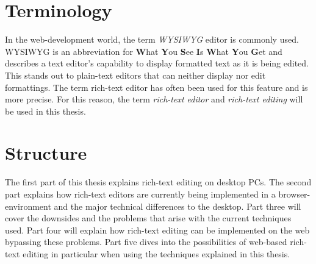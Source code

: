 \section{Terminology}

In the web-development world, the term \textit{WYSIWYG} editor is commonly used. WYSIWYG is an abbreviation for \textbf{W}hat \textbf{Y}ou \textbf{S}ee \textbf{I}s \textbf{W}hat \textbf{Y}ou \textbf{G}et and describes a text editor's capability to display formatted text as it is being edited. This stands out to plain-text editors that can neither display nor edit formattings. The term rich-text editor has often been used for this feature and is more precise. For this reason, the term \textit{rich-text editor} and \textit{rich-text editing} will be used in this thesis.


\section{Structure}

The first part of this thesis explains rich-text editing on desktop PCs. The second part explains how rich-text editors are currently being implemented in a browser-environment and the major technical differences to the desktop. Part three will cover the downsides and the problems that arise with the current techniques used. Part four will explain how rich-text editing can be implemented on the web bypassing these problems. Part five dives into the possibilities of web-based rich-text editing in particular when using the techniques explained in this thesis.


